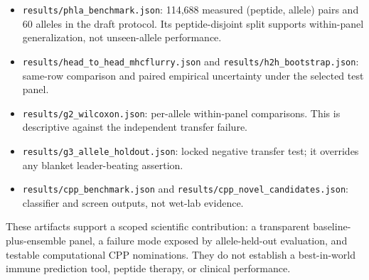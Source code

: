 \begin{itemize}
\tightlist
\item
  \texttt{results/phla\_benchmark.json}: 114,688 measured (peptide, allele) pairs and 60 alleles in the draft protocol. Its peptide-disjoint split supports within-panel generalization, not unseen-allele performance.
\item
  \texttt{results/head\_to\_head\_mhcflurry.json} and \texttt{results/h2h\_bootstrap.json}: same-row comparison and paired empirical uncertainty under the selected test panel.
\item
  \texttt{results/g2\_wilcoxon.json}: per-allele within-panel comparisons. This is descriptive against the independent transfer failure.
\item
  \texttt{results/g3\_allele\_holdout.json}: locked negative transfer test; it overrides any blanket leader-beating assertion.
\item
  \texttt{results/cpp\_benchmark.json} and \texttt{results/cpp\_novel\_candidates.json}: classifier and screen outputs, not wet-lab evidence.
\end{itemize}

These artifacts support a scoped scientific contribution: a transparent baseline-plus-ensemble panel, a failure mode exposed by allele-held-out evaluation, and testable computational CPP nominations. They do not establish a best-in-world immune prediction tool, peptide therapy, or clinical performance.
